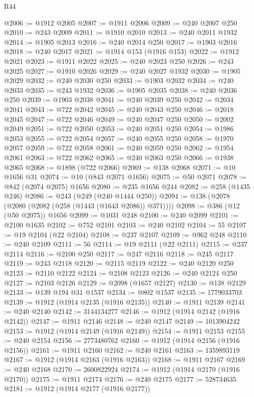 \begin{lexlean}{R44}
\begin{coremodule}
{@2006 := @1912 @2005
@2007 := @1911 @2006
@2009 := @240 @2007 @250
@2010 := @243 @2009
@2011 := @1910 @2010
@2013 := @240 @2011 @1932
@2014 := @1905 @2013
@2016 := @240 @2014 @250
@2017 := @1903 @2016
@2018 := @240 @2017
@2021 := @1914 @153 (@1916 @153)
@2022 := @1912 @2021
@2023 := @1911 @2022
@2025 := @240 @2023 @250
@2026 := @243 @2025
@2027 := @1910 @2026
@2029 := @240 @2027 @1932
@2030 := @1905 @2029
@2032 := @240 @2030 @250
@2033 := @1903 @2032
@2034 := @240 @2033
@2035 := @243 @1932
@2036 := @1905 @2035
@2038 := @240 @2036 @250
@2039 := @1903 @2038
@2041 := @240 @2039 @250
@2042 := @2034 @2041
@2043 := @722 @2042
@2045 := @240 @2043 @250
@2046 := @2018 @2045
@2047 := @722 @2046
@2049 := @240 @2047 @250
@2050 := @2002 @2049
@2051 := @722 @2050
@2053 := @240 @2051 @250
@2054 := @1986 @2053
@2055 := @722 @2054
@2057 := @240 @2055 @250
@2058 := @1970 @2057
@2059 := @722 @2058
@2061 := @240 @2059 @250
@2062 := @1954 @2061
@2063 := @722 @2062
@2065 := @240 @2063 @250
@2066 := @1938 @2065
@2068 := @1898 (@722 @2066)
@2069 := @138 @2068
@2071 := @10 @1656 @31
@2074 := @10 (@843 @2071 @1656)
@2075 := @50 @2071
@2078 := @842 (@2074 @2075) @1656
@2080 := @235 @1656 @244
@2082 := @258 (@1435 @246)
@2086 := @243 (@249 (@240 @1444 @250))
@2094 := @138 (@2078 (@2080 (@2082 (@258 (@1443 (@1643 @2086)) @371))))
@2098 := @386 (@12 (@50 @2075)) @1656
@2099 := @1031 @248
@2100 := @240 @2099
@2101 := @2100 @1635
@2102 := @752 @2101
@2103 := @240 @2102
@2104 := 55
@2107 := @19 @2104 (@22 @2104)
@2108 := @237 @2107
@2109 := @962 @248
@2110 := @240 @2109
@2111 := 56
@2114 := @19 @2111 (@22 @2111)
@2115 := @237 @2114
@2116 := @2100 @250
@2117 := @247 @2116
@2118 := @245 @2117
@2119 := @243 @2118
@2120 := @2115 @2119
@2122 := @240 @2120 @250
@2123 := @2110 @2122
@2124 := @2108 @2123
@2126 := @240 @2124 @250
@2127 := @2103 @2126
@2129 := @2098 (@1657 @2127)
@2130 := @138 @2129
@2133 := @139 @194 @31 @1537
@2134 := @802 @1537
@2135 := 1779033703
@2139 := @1912 (@1914 @2135 (@1916 @2135))
@2140 := @1911 @2139
@2141 := @240 @2140
@2142 := 3144134277
@2146 := @1912 (@1914 @2142 (@1916 @2142))
@2147 := @1911 @2146
@2148 := @240 @2147
@2149 := 1013904242
@2153 := @1912 (@1914 @2149 (@1916 @2149))
@2154 := @1911 @2153
@2155 := @240 @2154
@2156 := 2773480762
@2160 := @1912 (@1914 @2156 (@1916 @2156))
@2161 := @1911 @2160
@2162 := @240 @2161
@2163 := 1359893119
@2167 := @1912 (@1914 @2163 (@1916 @2163))
@2168 := @1911 @2167
@2169 := @240 @2168
@2170 := 2600822924
@2174 := @1912 (@1914 @2170 (@1916 @2170))
@2175 := @1911 @2174
@2176 := @240 @2175
@2177 := 528734635
@2181 := @1912 (@1914 @2177 (@1916 @2177))
}
\end{coremodule}
\end{lexlean}
